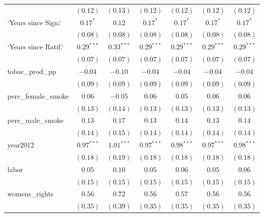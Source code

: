 \begin{table}[!h]
\begin{center}
\begin{tabular}{l c c c c c c }
                        & $(0.12)$     & $(0.13)$      & $(0.12)$     & $(0.12)$     & $(0.12)$     & $(0.12)$     \\
`Years since Sign.`     & $0.17^{*}$   & $0.12$        & $0.17^{*}$   & $0.17^{*}$   & $0.17^{*}$   & $0.17^{*}$   \\
                        & $(0.08)$     & $(0.08)$      & $(0.08)$     & $(0.08)$     & $(0.08)$     & $(0.08)$     \\
`Years since Ratif.`    & $0.29^{***}$ & $0.33^{***}$  & $0.29^{***}$ & $0.29^{***}$ & $0.29^{***}$ & $0.29^{***}$ \\
                        & $(0.07)$     & $(0.07)$      & $(0.07)$     & $(0.07)$     & $(0.07)$     & $(0.07)$     \\
tobac\_prod\_pp         & $-0.04$      & $-0.10$       & $-0.04$      & $-0.04$      & $-0.04$      & $-0.04$      \\
                        & $(0.09)$     & $(0.09)$      & $(0.09)$     & $(0.09)$     & $(0.09)$     & $(0.09)$     \\
perc\_female\_smoke     & $0.06$       & $-0.05$       & $0.06$       & $0.05$       & $0.06$       & $0.06$       \\
                        & $(0.13)$     & $(0.14)$      & $(0.13)$     & $(0.13)$     & $(0.13)$     & $(0.13)$     \\
perc\_male\_smoke       & $0.13$       & $0.17$        & $0.13$       & $0.14$       & $0.13$       & $0.14$       \\
                        & $(0.14)$     & $(0.15)$      & $(0.14)$     & $(0.14)$     & $(0.14)$     & $(0.14)$     \\
year2012                & $0.97^{***}$ & $1.01^{***}$  & $0.97^{***}$ & $0.98^{***}$ & $0.97^{***}$ & $0.98^{***}$ \\
                        & $(0.18)$     & $(0.19)$      & $(0.18)$     & $(0.18)$     & $(0.18)$     & $(0.18)$     \\
labor                   & $0.05$       & $0.10$        & $0.05$       & $0.06$       & $0.05$       & $0.06$       \\
                        & $(0.15)$     & $(0.15)$      & $(0.15)$     & $(0.15)$     & $(0.15)$     & $(0.15)$     \\
womens\_rights          & $0.56$       & $0.72$        & $0.56$       & $0.57$       & $0.56$       & $0.56$       \\
                        & $(0.35)$     & $(0.39)$      & $(0.35)$     & $(0.35)$     & $(0.35)$     & $(0.35)$     \\

\end{tabular}
\end{center}
\end{table}
